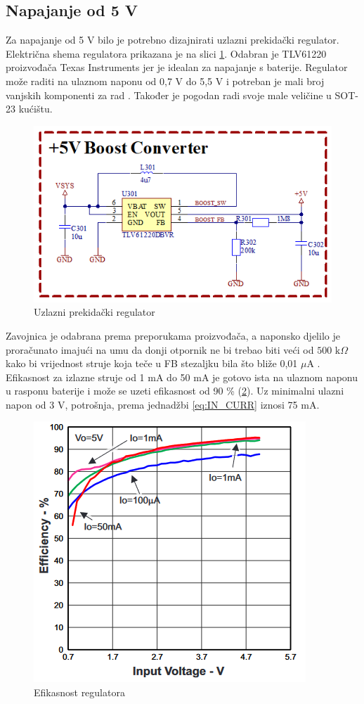 \subsection{Napajanje od 5 V}

Za napajanje od 5 V bilo je potrebno dizajnirati uzlazni prekidački regulator. Električna shema regulatora prikazana je na slici \ref{slk:BR_BOOST}. Odabran je TLV61220 proizvođača Texas Instruments jer je idealan za napajanje s baterije. Regulator može raditi na ulaznom naponu od 0,7 V do 5,5 V i potreban je mali broj vanjskih komponenti za rad \cite{ti:tlv61220}. Također je pogodan radi svoje male veličine u SOT-23 kućištu.
\begin{figure}[htb]
    \centering
    \includegraphics[width=10 cm]{Figures/BR_BOOST.png}
    \caption{Uzlazni prekidački regulator}
    \label{slk:BR_BOOST}
\end{figure}
Zavojnica je odabrana prema preporukama proizvođača, a naponsko djelilo je proračunato imajući na umu da donji otpornik ne bi trebao biti veći od $500\textrm{ k}\Omega$ kako bi vrijednost struje koja teče u FB stezaljku bila što bliže 0,01 $\mu\textrm{A}$ \cite{ti:tlv61220}. Efikasnost za izlazne struje od 1 mA do 50 mA je gotovo ista na ulaznom naponu u rasponu baterije i može se uzeti efikasnost od 90 \% (\ref{slk:BOOST_EFF}). Uz minimalni ulazni napon od 3 V, potrošnja, prema jednadžbi \ref{eq:IN_CURR} iznosi 75 mA.
\begin{figure}[H]
    \centering
    \includegraphics[width=6 cm]{Figures/BOOST_EFF.png}
    \caption{Efikasnost regulatora \cite{ti:tlv61220}}
    \label{slk:BOOST_EFF}
\end{figure}

